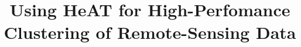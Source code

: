 
\title{
   Using HeAT for High-Perfomance Clustering of Remote-Sensing Data
}

\author{%
  \and
}


\maketitle

%
%
\iffalse
    \makeatletter
    \def\ps@IEEEtitlepagestyle{%
      \def\@oddfoot{\mycopyrightnotice}%
      \def\@evenfoot{}%
    }
    \makeatother
    \def\mycopyrightnotice{%
      \begin{minipage}{\textwidth}
        \footnotesize
        1551-3203 \copyright 2015 IEEE.
        Personal use is permitted, but republication/redistribution requires IEEE permission.
        \\
        See \url{https://www.ieee.org/publications_standards/publications/rights/index.html} for more information.
      \end{minipage}
      \gdef\mycopyrightnotice{}%
    }
\fi
